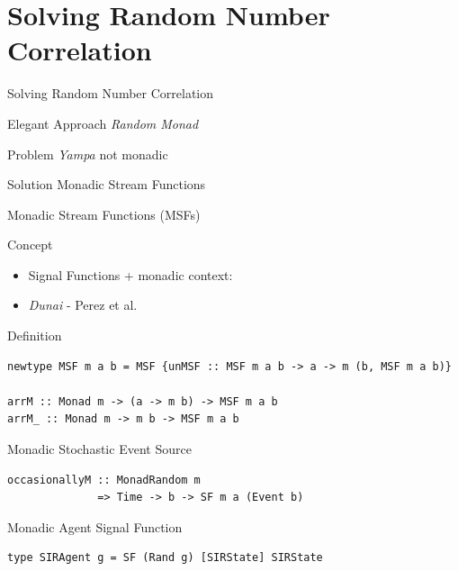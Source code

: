 \documentclass{beamer}
\begin{document}
\section{Solving Random Number Correlation}
\begin{frame}{Solving Random Number Correlation}
  \begin{block}{Elegant Approach}
  	\textit{Random Monad}
  \end{block} 
  
  \begin{block}{Problem}
  	\textit{Yampa} not monadic
  \end{block}
  
  \begin{block}{Solution}
    Monadic Stream Functions 
  \end{block}
\end{frame}

\begin{frame}[fragile]{Monadic Stream Functions (MSFs)}
\begin{block}{Concept}
\begin{itemize}
  \item Signal Functions + monadic context: 
  \item \textit{Dunai} - Perez et al.
\end{itemize}
\end{block}

\begin{block}{Definition}
\begin{verbatim}
newtype MSF m a b = MSF {unMSF :: MSF m a b -> a -> m (b, MSF m a b)}

arrM :: Monad m -> (a -> m b) -> MSF m a b
arrM_ :: Monad m -> m b -> MSF m a b
\end{verbatim}
\end{block}
    
\begin{block}{Monadic Stochastic Event Source}
\begin{verbatim}
occasionallyM :: MonadRandom m 
              => Time -> b -> SF m a (Event b)
\end{verbatim}
\end{block}

\begin{block}{Monadic Agent Signal Function}
\begin{verbatim}
type SIRAgent g = SF (Rand g) [SIRState] SIRState 
\end{verbatim}
\end{block}
\end{frame}
\end{document}
